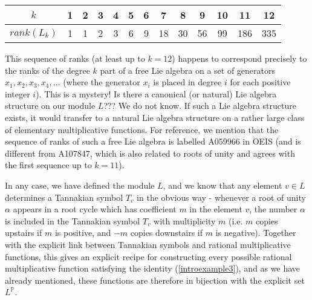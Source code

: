 \begin{example}
\begin{enumerate}
\vspace{6pt}
\begin{tabular}{  | c || c | c | c | c | c | c | c | c | c | c | c | c |   }
  \hline			
  $k$ & 1 & 2 & 3 & 4 & 5 & 6 & 7 & 8 & 9 & 10 & 11 & 12   \\
  \hline
  $rank(L_k) $ & 1 & 1 & 2 & 3 & 6 & 9 & 18 & 30 & 56 & 99 & 186 & 335    \\
  \hline  
\end{tabular}
\vspace{6pt}

This sequence of ranks (at least up to $k=12$) happens to correspond precisely to the ranks of the degree $k$ part of a free Lie algebra on a set of generators $x_1, x_2, x_3, x_4, \ldots$ (where the generator $x_i$ is placed in degree $i$ for each positive integer $i$). This is a mystery! Is there a canonical (or natural) Lie algebra structure on our module $L$??? We do not know. If such a Lie algebra structure exists, it would transfer to a natural Lie algebra structure on a rather large class of elementary multiplicative functions. For reference, we mention that the sequence of ranks of such a free Lie algebra is labelled A059966 in OEIS (and is different from A107847, which is also related to roots of unity and agrees with the first sequence up to $k=11$). 

In any case, we have defined the module $L$, and we know that any element $v \in L$ determines a Tannakian symbol $T_v$ in the obvious way - whenever a root of unity $\alpha$ appears in a root cycle which has coefficient $m$ in the element $v$, the number $\alpha$ is included in the Tannakian symbol $T_v$ with multiplicity $m$ (i.e. $m$ copies upstairs if $m$ is positive, and $-m$ copies downstairs if $m$ is negative). Together with the explicit link between Tannakian symbols and rational multiplicative functions, this gives an explicit recipe for constructing every possible rational multiplicative function satisfying the identity (\ref{introexample3}), and as we have already mentioned, these functions are therefore in bijection with the explicit set $L^{\mathbb{P}}$.


\end{enumerate}
\end{example}
